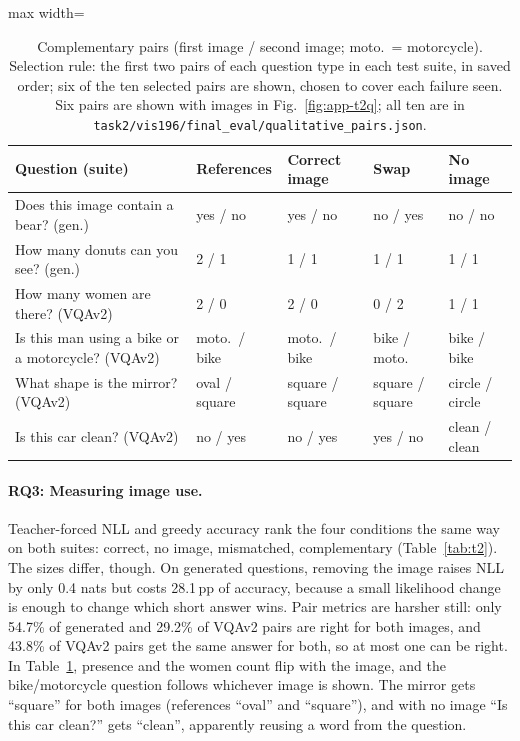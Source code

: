 \documentclass{article}
\newcommand{\pp}{\,pp}
\begin{document}
\begin{table}[t]\centering\footnotesize\setlength{\tabcolsep}{4pt}
\begin{adjustbox}{max width=\linewidth}\begin{tabular}{lllll}\toprule
Question (suite) & References & Correct image & Swap & No image \\\midrule
Does this image contain a bear? (gen.) & yes / no & yes / no & no / yes & no / no \\
How many donuts can you see? (gen.) & 2 / 1 & 1 / 1 & 1 / 1 & 1 / 1 \\
How many women are there? (VQAv2) & 2 / 0 & 2 / 0 & 0 / 2 & 1 / 1 \\
Is this man using a bike or a motorcycle? (VQAv2) & moto.\ / bike & moto.\ / bike & bike / moto. & bike / bike \\
What shape is the mirror? (VQAv2) & oval / square & square / square & square / square & circle / circle \\
Is this car clean? (VQAv2) & no / yes & no / yes & yes / no & clean / clean \\\bottomrule
\end{tabular}\end{adjustbox}
\caption{Complementary pairs (first image / second image; moto.\ = motorcycle). Selection rule: the first two pairs of each question type in each test suite, in saved order; six of the ten selected pairs are shown, chosen to cover each failure seen. Six pairs are shown with images in Fig.~\ref{fig:app-t2q}; all ten are in \texttt{task2/vis196/final\_eval/qualitative\_pairs.json}.}\label{tab:t2q}
\end{table}

\paragraph{RQ3: Measuring image use.} Teacher-forced NLL and greedy accuracy rank the four conditions the same way on both suites: correct, no image, mismatched, complementary (Table~\ref{tab:t2}). The sizes differ, though. On generated questions, removing the image raises NLL by only 0.4 nats but costs 28.1\pp{} of accuracy, because a small likelihood change is enough to change which short answer wins. Pair metrics are harsher still: only 54.7\% of generated and 29.2\% of VQAv2 pairs are right for both images, and 43.8\% of VQAv2 pairs get the same answer for both, so at most one can be right. In Table~\ref{tab:t2q}, presence and the women count flip with the image, and the bike/motorcycle question follows whichever image is shown. The mirror gets ``square'' for both images (references ``oval'' and ``square''), and with no image ``Is this car clean?'' gets ``clean'', apparently reusing a word from the question.
\end{document}
